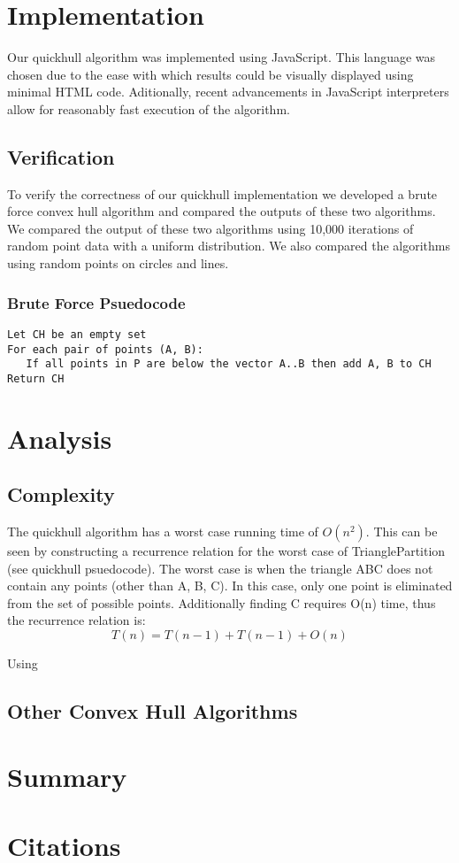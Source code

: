 \documentclass[11pt]{article}
\begin{document}
\section{Implementation}
Our quickhull algorithm was implemented using JavaScript. This language was chosen due to the ease with which results could be visually displayed using minimal HTML code. Aditionally, recent advancements in JavaScript interpreters allow for reasonably fast execution of the algorithm.

\subsection{Verification}
To verify the correctness of our quickhull implementation we developed a brute force convex hull algorithm and compared the outputs of these two algorithms. We compared the output of these two algorithms using 10,000 iterations of random point data with a uniform distribution. We also compared the algorithms using random points on circles and lines.

\subsubsection{Brute Force Psuedocode}
\begin{verbatim}
Let CH be an empty set
For each pair of points (A, B):
   If all points in P are below the vector A..B then add A, B to CH
Return CH
\end{verbatim}

\section{Analysis}

\subsection{Complexity}
The quickhull algorithm has a worst case running time of $O(n^2)$. This can be seen by constructing a recurrence relation for the worst case of TrianglePartition (see quickhull psuedocode). The worst case is when the triangle ABC does not contain any points (other than A, B, C). In this case, only one point is eliminated from the set of possible points. Additionally finding C requires O(n) time, thus the recurrence relation is:
\[ T(n) = T(n - 1) + T(n - 1) + O(n) \]

Using 

\subsection{Other Convex Hull Algorithms}

\section{Summary}

\section{Citations}
\end{document}
